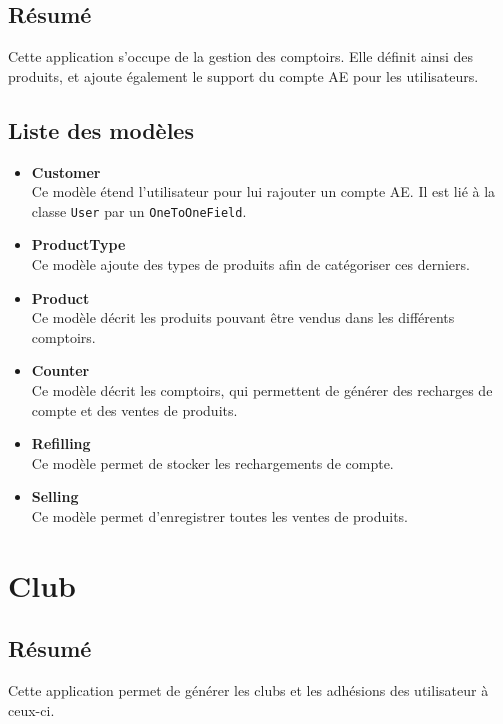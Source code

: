 \documentclass[a4paper]{report}
\begin{document}
\subsection{Résumé}
\label{sub:r_sum_}
\par Cette application s'occupe de la gestion des comptoirs. Elle définit ainsi des produits, et ajoute également le
support du compte AE pour les utilisateurs.

\subsection{Liste des modèles}
\label{sub:liste_des_mod_les}
\begin{itemize}
    \item \textbf{Customer} \\
        Ce modèle étend l'utilisateur pour lui rajouter un compte AE. Il est lié à la classe \verb#User# par un
        \verb#OneToOneField#.
    \item \textbf{ProductType} \\
        Ce modèle ajoute des types de produits afin de catégoriser ces derniers.
    \item \textbf{Product} \\
        Ce modèle décrit les produits pouvant être vendus dans les différents comptoirs.
    \item \textbf{Counter} \\
        Ce modèle décrit les comptoirs, qui permettent de générer des recharges de compte et des ventes de produits.
    \item \textbf{Refilling} \\
        Ce modèle permet de stocker les rechargements de compte.
    \item \textbf{Selling} \\
        Ce modèle permet d'enregistrer toutes les ventes de produits.
\end{itemize}


\section{Club}
\label{sec:club}
\subsection{Résumé}
\label{sub:r_sum_}
\par Cette application permet de générer les clubs et les adhésions des utilisateur à ceux-ci.
\end{document}
